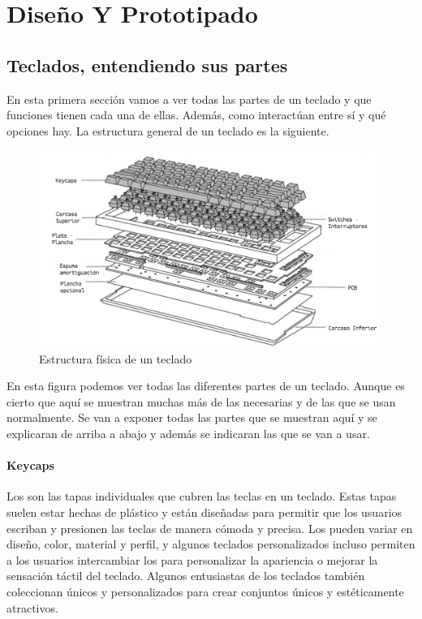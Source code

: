 \chapter{Diseño Y Prototipado} \label{CapDiseño}

\section{Teclados, entendiendo sus partes}

En esta primera sección vamos a ver todas las partes de un teclado y que funciones tienen cada una de ellas. Además, como interactúan entre sí y qué opciones hay. \cite{TearDownImageSource} La estructura general de un teclado es la siguiente.

\begin{figure}[H]
    \centering
    \includegraphics[width=1\textwidth]{imagenes/Capitulos/Cap03/KeyboardTeardown.png}
    \caption{Estructura física de un teclado \cite{TearDownImageSource}}
    \label{fig:TearDown}
\end{figure}

En esta figura podemos ver todas las diferentes partes de un teclado. Aunque es cierto que aquí se muestran muchas más de las necesarias y de las que se usan normalmente. Se van a exponer todas las partes que se muestran aquí y se explicaran de arriba a abajo y además se indicaran las que se van a usar.

\subsubsection{\gls{Keycaps}}

Los  son las tapas individuales que cubren las teclas en un teclado. Estas tapas suelen estar hechas de plástico y están diseñadas para permitir que los usuarios escriban y presionen las teclas de manera cómoda y precisa. Los  pueden variar en diseño, color, material y perfil, y algunos teclados personalizados incluso permiten a los usuarios intercambiar los  para personalizar la apariencia o mejorar la sensación táctil del teclado. Algunos entusiastas de los teclados también coleccionan  únicos y personalizados para crear conjuntos únicos y estéticamente atractivos.

